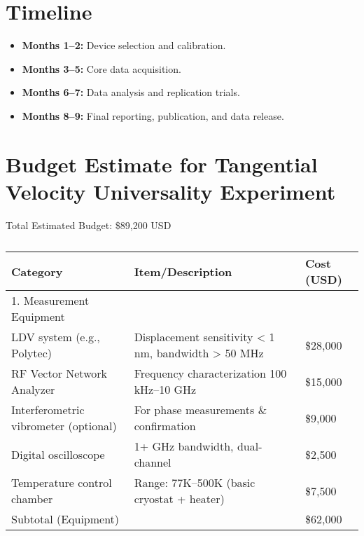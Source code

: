         \section*{Timeline}
        \begin{itemize}
            \item \textbf{Months 1–2:} Device selection and calibration.
            \item \textbf{Months 3–5:} Core data acquisition.
            \item \textbf{Months 6–7:} Data analysis and replication trials.
            \item \textbf{Months 8–9:} Final reporting, publication, and data release.
        \end{itemize}

\section*{Budget Estimate for Tangential Velocity Universality Experiment}

Total Estimated Budget: \$89,200 USD


\begin{table}
    \footnotesize
    \centering
    \begin{tabular}{lll}
        \toprule
        \textbf{Category} & \textbf{Item/Description} & \textbf{Cost (USD)} \\
        \midrule
        1. Measurement Equipment &  &  \\
        LDV system (e.g., Polytec) & Displacement sensitivity < 1 nm, bandwidth > 50 MHz & \$28,000 \\
        RF Vector Network Analyzer & Frequency characterization 100 kHz–10 GHz & \$15,000 \\
        Interferometric vibrometer (optional) & For phase measurements \& confirmation & \$9,000 \\
        Digital oscilloscope &  1+ GHz bandwidth, dual-channel & \$2,500 \\
        Temperature control chamber & Range: 77K–500K (basic cryostat + heater) & \$7,500 \\
        Subtotal (Equipment) &  & \$62,000 \\
        \bottomrule
    \end{tabular}
    \caption{}
    \label{tab:equipment}
\end{table}


